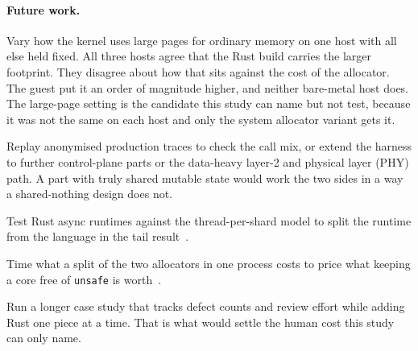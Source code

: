 \documentclass[english,oneside,a4paper,censored,csm,software-track-2020]{HYthesisML}
\begin{document}
\paragraph{Future work.}
\begin{compactitem}
\item Vary how the kernel uses large pages for ordinary memory on one host with all else held
fixed. All three hosts agree that the Rust build carries the larger footprint. They disagree
about how that sits against the cost of the allocator. The guest put it an order of magnitude
higher, and neither bare-metal host does. The large-page setting is the candidate this study
can name but not test, because it was not the same on each host and only the system allocator
variant gets it.

\item Replay anonymised production traces to check the call mix, or extend the harness to further
control-plane parts or the data-heavy layer-2 and physical layer (PHY) path. A part with truly
shared mutable state would work the two sides in a way a shared-nothing design does not.

\item Test Rust async runtimes against the thread-per-shard model to split the runtime from the
language in the tail result~\cite{arvidsson2025async}.

\item Time what a split of the two allocators in one process costs to price what keeping a core
free of \texttt{unsafe} is worth~\cite{rivera2021galeed,kirth2022pkrusafe}.

\item Run a longer case study that tracks defect counts and review effort while adding Rust one
piece at a time. That is what would settle the human cost this study can only name.
\end{compactitem}




\cleardoublepage %

\printbibliography
\end{document}
